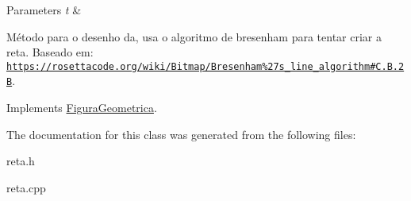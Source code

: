 \begin{DoxyParams}{Parameters}
{\em t} & \\
\hline
\end{DoxyParams}
Método para o desenho da, usa o algoritmo de bresenham para tentar criar a reta. Baseado em\+: \href{https://rosettacode.org/wiki/Bitmap/Bresenham%27s_line_algorithm#C.2B.2B}{\tt https\+://rosettacode.\+org/wiki/\+Bitmap/\+Bresenham\%27s\+\_\+line\+\_\+algorithm\#\+C.\+2\+B.\+2B}. 

Implements \hyperlink{classFiguraGeometrica_a68c63fbb8df93c677d9e8d134bb57f94}{Figura\+Geometrica}.



The documentation for this class was generated from the following files\+:\begin{DoxyCompactItemize}
\item 
reta.\+h\item 
reta.\+cpp\end{DoxyCompactItemize}
